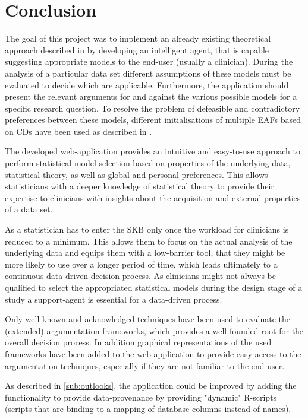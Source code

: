 \section{Conclusion}
\label{sec:conclusion}
The goal of this project was to implement an already existing theoretical approach described in \cite{sassoon2016, sassoon2014, sassoon2016CD} by developing an intelligent agent, that is capable suggesting appropriate models to the end-user (usually a clinician). During the analysis of a particular data set different assumptions of these models must be evaluated to decide which are applicable. Furthermore, the application should present the relevant arguments for and against the various possible models  for a specific research question. To resolve the problem of defeasible and contradictory preferences between these models, different initialisations of multiple \glspl{EAF} based on \glspl{CD} have been used as described in \cite{sassoon2016, sassoon2016CD}.

The developed web-application provides an intuitive and easy-to-use approach to perform statistical model selection based on properties of the underlying data, statistical theory, as well as global and personal preferences. This allows statisticians with a deeper knowledge of statistical theory to provide their expertise to clinicians with insights about the acquisition and external properties of a data set. 

As a statistician has to enter the \gls{SKB} only once the workload for clinicians is reduced to a minimum. This allows them to focus on the actual analysis of the underlying data and equips them with a low-barrier tool, that they might be more likely to use over a longer period of time, which leads ultimately to a continuous data-driven decision process. As clinicians might not always be qualified to select the appropriated statistical models during the design stage of a study \cite{sassoon2014} a support-agent is essential for a data-driven process.

Only well known and acknowledged techniques have been used to evaluate the (extended) argumentation frameworks, which provides a well founded root for the overall decision process. In addition graphical representations of the used frameworks have been added to the web-application to provide easy access to the argumentation techniques, especially if they are not familiar to the end-user.

As described in \autoref{sub:outlooks}, the application could be improved by adding the functionality to provide data-provenance by providing "dynamic" \gls{R}-scripts (scripts that are binding to a mapping of database columns instead of names). 


